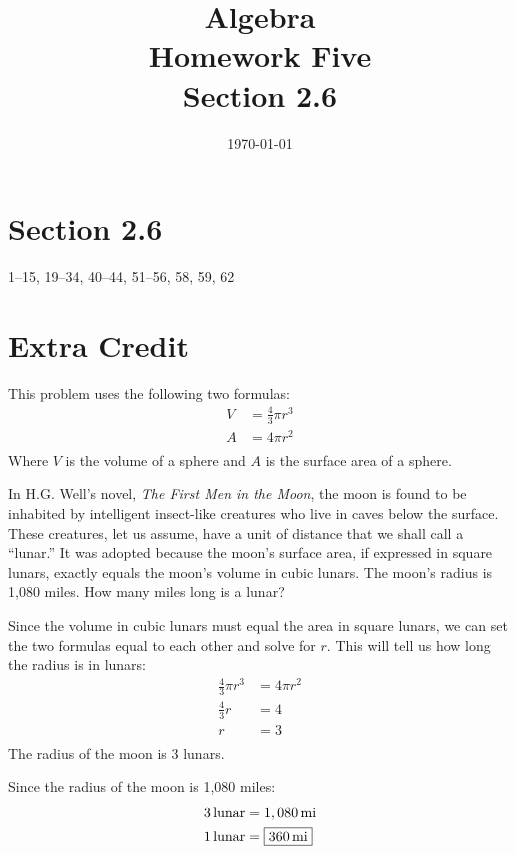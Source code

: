 \documentclass[letterpaper]{exam}
\title{Algebra \\ Homework Five \\ Section 2.6 }
\author{}
\date{\today}
\begin{document}
  \maketitle

 \section{Section 2.6}
  1--15, 19--34, 40--44, 51--56, 58, 59, 62

  \section{Extra Credit}

  This problem uses the following two formulas:
  \begin{align*}
    V & = \frac{4}{3} \pi r^3 \\
    A & = 4 \pi r^2 \\
  \end{align*}
  Where $V$ is the volume of a sphere and $A$ is the surface area of a sphere.

  In H.G. Well's novel, {\em The First Men in the Moon}, the moon is found
  to be inhabited by intelligent insect-like creatures who live in caves
  below the surface.  These creatures, let us assume, have a unit of
  distance that we shall call a ``lunar.''  It was adopted because the
  moon's surface area, if expressed in square lunars, exactly equals the
  moon's volume in cubic lunars.  The moon's radius is 1,080 miles.  How
  many miles long is a lunar?

  \begin{solution}
    Since the volume in cubic lunars must equal the area in square lunars,
    we can set the two formulas equal to each other and solve for $r$.
    This will tell us how long the radius is in lunars:
    \begin{align*}
      \frac{4}{3} \pi r^3 & = 4 \pi r^2 \\
      \frac{4}{3} r       & = 4 \\
      r                   & = 3 \\
    \end{align*}
    The radius of the moon is 3 lunars. 
    
    Since the radius of the moon is 1,080 miles:
    \begin{align*}
      \unit[3]{lunar} &= \unit[1,080]{mi} \\
      \unit[1]{lunar} &= \boxed{ \unit[360]{mi} } \\
    \end{align*}

  \end{solution}
\end{document}
